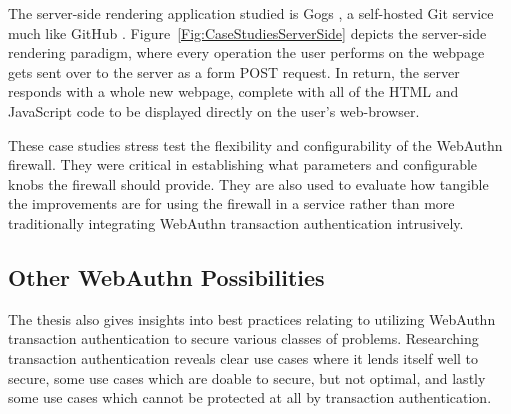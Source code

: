 The server-side rendering application studied is Gogs \cite{gogs}, a self-hosted Git service much like GitHub \cite{github}. Figure~\ref{Fig:CaseStudiesServerSide} depicts the server-side rendering paradigm, where every operation the user performs on the webpage gets sent over to the server as a form POST request. In return, the server responds with a whole new webpage, complete with all of the HTML and JavaScript code to be displayed directly on the user's web-browser.


These case studies stress test the flexibility and configurability of the WebAuthn firewall. They were critical in establishing what parameters and configurable knobs the firewall should provide. They are also used to evaluate how tangible the improvements are for using the firewall in a service rather than more traditionally integrating WebAuthn transaction authentication intrusively. 


\subsection{Other WebAuthn Possibilities}

The thesis also gives insights into best practices relating to utilizing WebAuthn transaction authentication to secure various classes of problems. Researching transaction authentication reveals clear use cases where it lends itself well to secure, some use cases which are doable to secure, but not optimal, and lastly some use cases which cannot be protected at all by transaction authentication. 



